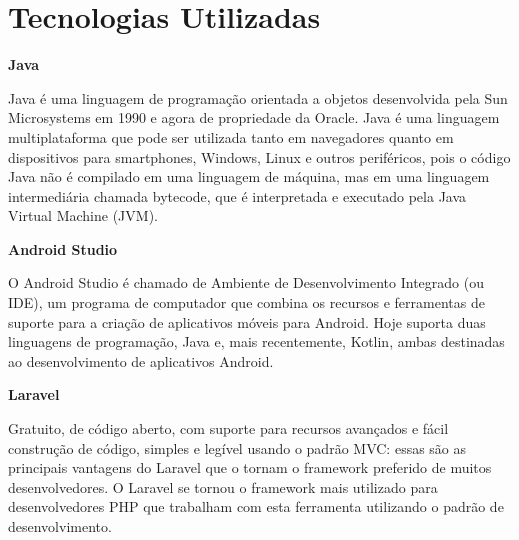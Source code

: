\section{Tecnologias Utilizadas} 
	\textbf{Java}
	
	Java é uma linguagem de programação orientada a objetos desenvolvida pela Sun Microsystems em 1990 e agora de propriedade da Oracle. Java é uma linguagem multiplataforma que pode ser utilizada tanto em navegadores quanto em dispositivos para smartphones, Windows, Linux e outros periféricos, pois o código Java não é compilado em uma linguagem de máquina, mas em uma linguagem intermediária chamada bytecode, que é interpretada e executado pela Java Virtual Machine (JVM).
	
	\textbf{Android Studio}
	
	O Android Studio é chamado de Ambiente de Desenvolvimento Integrado (ou IDE), um programa de computador que combina os recursos e ferramentas de suporte para a criação de aplicativos móveis para Android. Hoje suporta duas linguagens de programação, Java e, mais recentemente, Kotlin, ambas destinadas ao desenvolvimento de aplicativos Android.
	
	\textbf{Laravel}
	
	Gratuito, de código aberto, com suporte para recursos avançados e fácil construção de código, simples e legível usando o padrão MVC: essas são as principais vantagens do Laravel que o tornam o framework preferido de muitos desenvolvedores. O Laravel se tornou o framework mais utilizado para desenvolvedores PHP que trabalham com esta ferramenta utilizando o padrão de desenvolvimento.%
	
